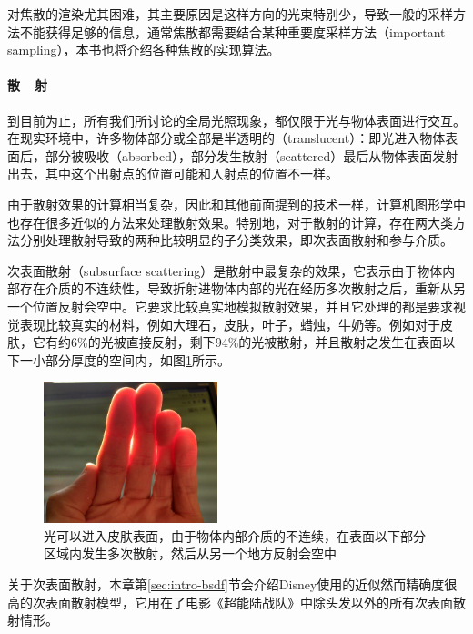 对焦散的渲染尤其困难，其主要原因是这样方向的光束特别少，导致一般的采样方法不能获得足够的信息，通常焦散都需要结合某种重要度采样方法（important sampling），本书也将介绍各种焦散的实现算法。



\paragraph{散~~射}
到目前为止，所有我们所讨论的全局光照现象，都仅限于光与物体表面进行交互。在现实环境中，许多物体部分或全部是半透明的（translucent）：即光进入物体表面后，部分被吸收（absorbed），部分发生散射（scattered）最后从物体表面发射出去，其中这个出射点的位置可能和入射点的位置不一样。

由于散射效果的计算相当复杂，因此和其他前面提到的技术一样，计算机图形学中也存在很多近似的方法来处理散射效果。特别地，对于散射的计算，存在两大类方法分别处理散射导致的两种比较明显的子分类效果，即次表面散射和参与介质。

次表面散射（subsurface scattering）是散射中最复杂的效果，它表示由于物体内部存在介质的不连续性，导致折射进物体内部的光在经历多次散射之后，重新从另一个位置反射会空中。它要求比较真实地模拟散射效果，并且它处理的都是要求视觉表现比较真实的材料，例如大理石，皮肤，叶子，蜡烛，牛奶等。例如对于皮肤，它有约6\%的光被直接反射，剩下94\%的光被散射，并且散射之发生在表面以下一小部分厚度的空间内，如图\ref{f:intro-sss}所示。

\begin{figure}
\sidecaption
\includegraphics[width=0.45\textwidth]{figures/intro/subsurface-scattering}	
\caption{光可以进入皮肤表面，由于物体内部介质的不连续，在表面以下部分区域内发生多次散射，然后从另一个地方反射会空中}
\label{f:intro-sss}
\end{figure}

关于次表面散射，本章第\ref{sec:intro-bsdf}节会介绍Disney使用的近似然而精确度很高的次表面散射模型，它用在了电影《超能陆战队》中除头发以外的所有次表面散射情形。

